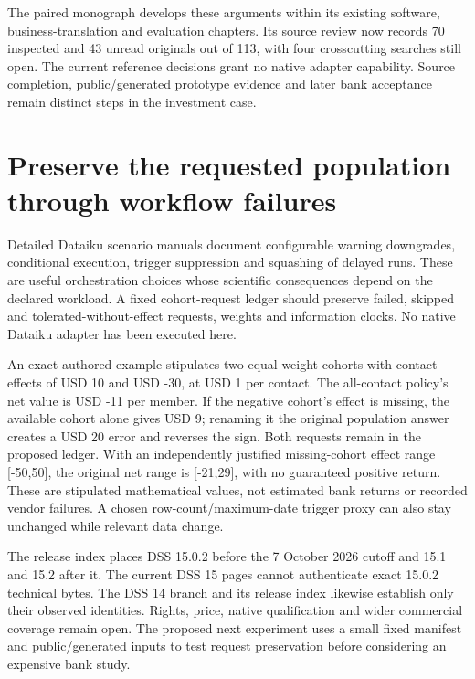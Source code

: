 The paired monograph develops these arguments within its existing
software, business-translation and evaluation chapters. Its source
review now records 70 inspected and 43 unread originals out of 113, with
four crosscutting searches still open. The current reference decisions
grant no native adapter capability. Source completion, public/generated
prototype evidence and later bank acceptance remain distinct steps in
the investment case. \citep{sp23nt_reader,sp23nt_progress}

\hypertarget{preserve-the-requested-population-through-workflow-failures}{%
\section{Preserve the requested population through workflow
failures}\label{preserve-the-requested-population-through-workflow-failures}}

Detailed Dataiku scenario manuals document configurable warning
downgrades, conditional execution, trigger suppression and squashing of
delayed runs. These are useful orchestration choices whose scientific
consequences depend on the declared workload. A fixed cohort-request
ledger should preserve failed, skipped and tolerated-without-effect
requests, weights and information clocks. No native Dataiku adapter has
been executed here.
\citep{exec23_dss_latest_flow,exec23_dss_latest_triggers,exec23_dss_latest_steps,exec23_dss_dss14_flow}

An exact authored example stipulates two equal-weight cohorts with
contact effects of USD 10 and USD -30, at USD 1 per contact. The
all-contact policy's net value is USD -11 per member. If the negative
cohort's effect is missing, the available cohort alone gives USD 9;
renaming it the original population answer creates a USD 20 error and
reverses the sign. Both requests remain in the proposed ledger. With an
independently justified missing-cohort effect range {[}-50,50{]}, the
original net range is {[}-21,29{]}, with no guaranteed positive return.
These are stipulated mathematical values, not estimated bank returns or
recorded vendor failures. A chosen row-count/maximum-date trigger proxy
can also stay unchanged while relevant data change.
\citep{exec23_dss_denominator_reference}

The release index places DSS 15.0.2 before the 7 October 2026 cutoff and
15.1 and 15.2 after it. The current DSS 15 pages cannot authenticate
exact 15.0.2 technical bytes. The DSS 14 branch and its release index
likewise establish only their observed identities. Rights, price, native
qualification and wider commercial coverage remain open. The proposed
next experiment uses a small fixed manifest and public/generated inputs
to test request preservation before considering an expensive bank study.
\citep{exec23_dss_latest_releases,exec23_dss_dss14_releases}

